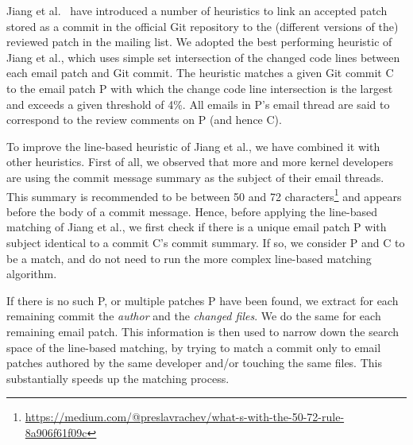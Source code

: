 Jiang et al.~\cite{msr13jojo,jiang14} have introduced a number of heuristics to link an accepted patch stored as a commit in the official Git repository to the (different versions of the) reviewed patch in the mailing list. We adopted the best performing heuristic of Jiang et al., which %
uses simple set intersection of the changed code lines between each email patch and Git commit. The heuristic matches a given Git commit C to the email patch P with which the change code line intersection is the largest and exceeds a given threshold of 4\%. All emails in P's email thread are said to correspond to the review comments on P (and hence C).%

To improve %
the line-based heuristic of Jiang et al., we have combined it with other heuristics. First of all, we observed that more and more kernel developers are using the commit message summary as the subject of their email threads. %
This summary is recommended to be between 50 and 72 characters\footnote{\url{https://medium.com/@preslavrachev/what-s-with-the-50-72-rule-8a906f61f09c}} and appears before the body of a commit message. Hence, before applying the line-based matching of Jiang et al., we first check if there is a unique email patch P with subject identical to a commit C's commit summary. If so, we consider P and C to be a match, and do not need to run the more complex line-based matching algorithm.

If there is no such P, or multiple patches P have been found, %
we extract for each remaining commit the \textit{author} and the \textit{changed files}. We do the same for each remaining email patch. This information is then used to narrow down the search space of the line-based matching, by trying to match a commit only to email patches authored by the same developer and/or touching the same files. This substantially speeds up the matching process.%

